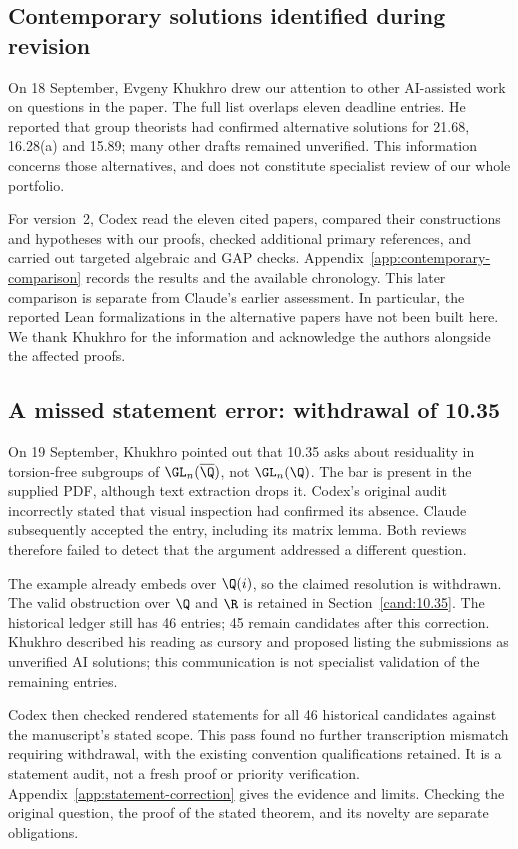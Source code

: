\subsection{Contemporary solutions identified during revision}

On 18 September, Evgeny Khukhro drew our attention to other AI-assisted
work on questions in the paper. The full list overlaps eleven deadline
entries. He reported that group theorists had confirmed alternative
solutions for 21.68, 16.28(a) and 15.89; many other drafts remained
unverified. This information concerns those alternatives, and does not
constitute specialist review of our whole portfolio.

For version~2, Codex read the eleven cited papers, compared their
constructions and hypotheses with our proofs, checked additional primary
references, and carried out targeted algebraic and GAP checks.
Appendix~\ref{app:contemporary-comparison} records the results and the
available chronology. This later comparison is separate from Claude's
earlier assessment. In particular, the reported Lean formalizations in
the alternative papers have not been built here. We thank Khukhro for
the information and acknowledge the authors alongside the affected proofs.

\subsection{A missed statement error: withdrawal of 10.35}
\label{sec:withdrawal-10-35}

On 19 September, Khukhro pointed out that 10.35 asks about residuality
in torsion-free subgroups of \(\GL_n(\overline{\Q})\), not
\(\GL_n(\Q)\). The bar is present in the supplied PDF, although
text extraction drops it. Codex's original audit incorrectly stated
that visual inspection had confirmed its absence. Claude subsequently
accepted the entry, including its matrix lemma. Both reviews therefore
failed to detect that the argument addressed a different question.

The example already embeds over \(\Q(i)\), so the claimed resolution
is withdrawn. The valid obstruction over \(\Q\) and \(\R\) is retained
in Section~\ref{cand:10.35}. The historical ledger still has 46 entries;
45 remain candidates after this correction. Khukhro described his reading
as cursory and proposed listing the submissions as unverified AI solutions;
this communication is not specialist validation of the remaining entries.

Codex then checked rendered statements for all 46 historical candidates
against the manuscript's stated scope. This pass found no further
transcription mismatch requiring withdrawal, with the existing convention
qualifications retained. It is a statement audit, not a fresh proof or
priority verification. Appendix~\ref{app:statement-correction} gives
the evidence and limits. Checking the original question, the proof of
the stated theorem, and its novelty are separate obligations.
